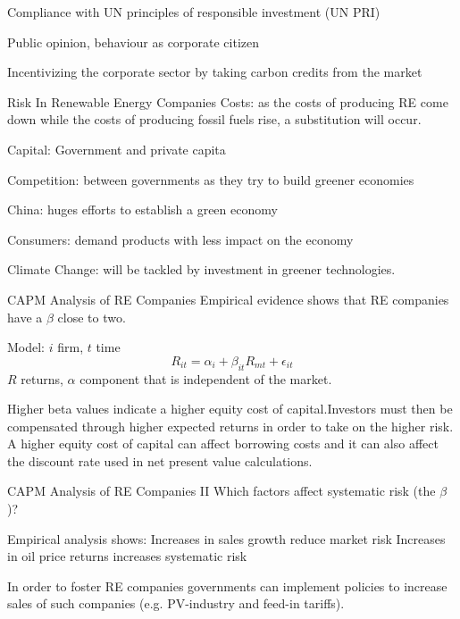 	Compliance with UN principles of responsible investment (UN PRI)
	
	Public opinion, behaviour as corporate citizen
	
	Incentivizing the corporate sector by taking carbon credits from the market


Risk In Renewable Energy Companies
	Costs: as the costs of producing RE come down while the costs of producing fossil fuels rise, a
	substitution will occur.
	
	Capital: Government and private capita
	
	Competition: between governments as they try to build greener economies
	
	China: huges efforts to establish a green economy
	
	Consumers: demand products with less impact on the economy
	
	Climate Change: will be tackled by investment in greener technologies.


CAPM Analysis of RE Companies
	Empirical evidence shows that RE companies have a $\beta$ close to two.
	
	Model: $i$ firm, $t$ time
		$$
		R_{it}= \alpha_i + \beta_{it} R_{mt}+\epsilon_{it}
		$$
	$R$ returns, $\alpha$ component that is independent of the market.
 
	Higher beta values indicate a higher equity cost of capital.Investors must then be compensated
	through higher expected returns in order to take on the higher risk. A higher equity cost of capital can affect borrowing costs and
	it can also affect the discount rate used in net present value calculations.


CAPM Analysis of RE Companies II
	Which factors affect systematic risk (the $\beta$)?
	
	Empirical analysis shows:
		Increases in sales growth reduce market risk
		Increases in oil price returns increases systematic risk
	
	In order to foster RE companies governments can implement policies to increase sales of such companies (e.g. PV-industry and feed-in tariffs).




	
